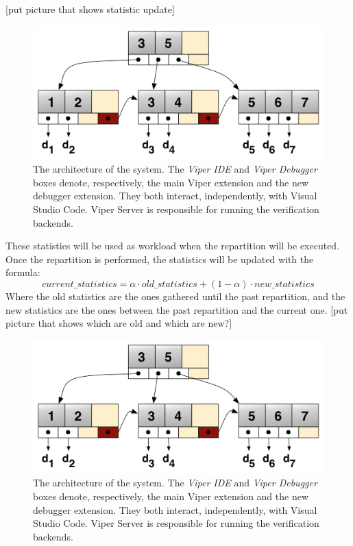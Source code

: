 [put picture that shows statistic update]
\begin{figure}[htb]
  \centering
  \includegraphics{img/b+tree.png}
  \caption[The architecture of the system]{ The architecture of the system. The
    \textit{Viper IDE} and \textit{Viper Debugger} boxes denote, respectively,
    the main Viper extension and the new debugger extension. They both interact,
    independently, with Visual Studio Code. Viper Server is responsible for
    running the verification backends.}
  \label{fig:b+tree}
\end{figure}

These statistics will be used as workload when the repartition will be executed. Once the repartition is performed, the statistics will be updated with the formula:
$$ current\_statistics = \alpha \cdot old\_statistics + (1-\alpha) \cdot new\_statistics $$
Where the old statistics are the ones gathered until the past repartition, and the new statistics are the ones between the past repartition and the current one.
[put picture that shows which are old and which are new?]
\begin{figure}[htb]
  \centering
  \includegraphics{img/b+tree.png}
  \caption[The architecture of the system]{ The architecture of the system. The
    \textit{Viper IDE} and \textit{Viper Debugger} boxes denote, respectively,
    the main Viper extension and the new debugger extension. They both interact,
    independently, with Visual Studio Code. Viper Server is responsible for
    running the verification backends.}
  \label{fig:b+tree}
\end{figure}


